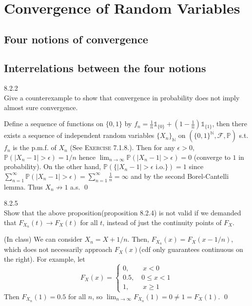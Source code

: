 \section{Convergence of Random Variables}

\subsection{Four notions of convergence}
\subsection{Interrelations between the four notions}
\begin{exercise}\label{8.2.2}8.2.2\\
Give a counterexample to show that convergence in probability does not imply almost sure convergence.
\end{exercise}
\begin{answer}

Define a sequence of functions on $\{0,1\}$ by $f_n=\frac{1}{n}\mathds{1}_{\{0\}}+(1-\frac{1}{n})\mathds{1}_{\{1\}}$, then there exists a sequence of independent random variables $\{X_n\}_{\mathbb{N}}$ on $(\{0,1\}^\mathbb{N},\mathcal{F},\mathbb{P})$ s.t. $f_n$ is the p.m.f. of $X_n$ (See \textsc{Exercise 7.1.8.}). Then for any $\epsilon>0$, $\mathbb{P}(|X_n-1|>\epsilon)=1/n$ hence $\lim_{n\rightarrow\infty}\mathbb{P}(|X_n-1|>\epsilon)=0$ (converge to $1$ in probability). On the other hand, $\mathbb{P}(\{|X_n-1|>\epsilon\text{ i.o.}\})=1$ since $\sum_{n=1}^\infty\mathbb{P}(|X_n-1|>\epsilon)=\sum_{n=1}^\infty\frac{1}{n}=\infty$ and by the second Borel-Cantelli lemma. Thus $X_n\not\to 1$ a.s. 
\qquad \qed
\end{answer}

\begin{exercise}8.2.5 \\
Show that the above proposition(proposition 8.2.4) is not valid if we demanded that $F_{X_n}(t) \to F_X(t)$ for all $t$, instead of just the continuity points of $F_X$.
\end{exercise}

\begin{answer}(In class)
We can consider $X_n = X + 1/n$. Then, $F_{X_n}(x) = F_X(x-1/n)$, which does not necessarily approach $F_X(x)$(cdf only guarantees continuous on the right).
For example, let
\begin{equation}
    F_X(x) = 
    \begin{cases}
    0,\qquad x < 0 \\
    0.5,\quad 0 \leq x < 1 \\
    1,\qquad x \geq 1
    \end{cases}
\end{equation} Then $F_{X_n}(1) = 0.5$ for all $n$, so $\lim_{n \to \infty} F_{X_n}(1) = 0 \neq 1 = F_X(1)$.
\qquad \qed
\end{answer}

